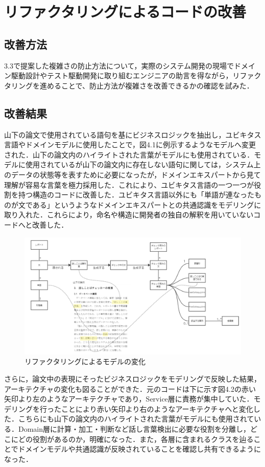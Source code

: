 \documentclass[12pt, a4paper]{jreport}
\begin{document}
\chapter{リファクタリングによるコードの改善}
\section{改善方法}
3.3で提案した複雑さの防止方法について，実際のシステム開発の現場でドメイン駆動設計やテスト駆動開発に取り組むエンジニアの助言を得ながら，リファクタリングを進めることで、防止方法が複雑さを改善できるかの確認を試みた．
\section{改善結果}
山下の論文で使用されている語句を基にビジネスロジックを抽出し，ユビキタス言語やドメインモデルに使用したことで，図4.1に例示するようなモデルへ変更された．山下の論文内のハイライトされた言葉がモデルにも使用されている．モデルに使用されているが山下の論文内に存在しない語句に関しては，システム上のデータの状態等を表すために必要になったが，ドメインエキスパートから見て理解が容易な言葉を極力採用した．これにより、ユビキタス言語の一つ一つが役割を持つ構造のコードに改善した．ユビキタス言語以外にも「単語が連なったものが文である」というようなドメインエキスパートとの共通認識をモデリングに取り入れた．これらにより，命名や構造に開発者の独自の解釈を用いていないコードへと改善した．
\begin{figure}[H]
\centering
\includegraphics[width=1\linewidth]{image/kaizen2.1.png}
\caption{リファクタリングによるモデルの変化}
\label{fig:enter-label}
\end{figure}
さらに，論文中の表現にそったビジネスロジックをモデリングで反映した結果，アーキテクチャの変化も図ることができた．元のコードは下に示す図4.2の赤い矢印より左のようなアーキテクチャであり，Service層に責務が集中していた．モデリングを行ったことにより赤い矢印より右のようなアーキテクチャへと変化した．こちらにも山下の論文内のハイライトされた言葉がモデルにも使用されている．Domain層に計算・加工・判断など話し言葉検出に必要な役割を分離し，どこにどの役割があるのか，明確になった．また，各層に含まれるクラスを辿ることでドメインモデルや共通認識が反映されていることを確認し共有できるようになった．
\end{document}

